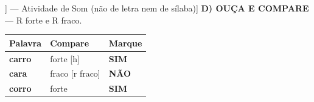 \begin{exercicio}[Som /h/ [[h]] --- Atividade de Som (não de letra nem de sílaba)]
\textbf{D) OUÇA E COMPARE} --- R forte e R fraco.

\begin{center}
\begin{tabular}{@{}p{4.2cm}p{6.2cm}p{1.6cm}@{}}
\hline
\textbf{Palavra} & \textbf{Compare} & \textbf{Marque} \\
\hline
\textbf{carro} & forte [h] & \textbf{SIM} \\
\textbf{cara} & fraco [r fraco] & \textbf{NÃO} \\
\textbf{corro} & forte & \textbf{SIM} \\
\hline
\end{tabular}
\end{center}

\end{exercicio}

